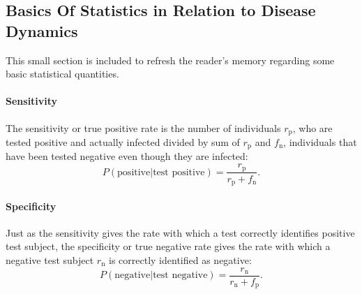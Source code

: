 \subsection{Basics Of Statistics in Relation to Disease Dynamics}
This small section is included to refresh the reader's memory regarding some basic statistical quantities. 
\paragraph{Sensitivity}
The sensitivity or true positive rate is the number of individuals $r_\text{p}$, who are tested positive and actually infected divided by sum of $r_\text{p}$ and $f_\text{n}$, individuals that have been tested negative even though they are infected:
\begin{equation}
P(\text{positive} | \text{test positive}) = \frac{r_\text{p}}{r_\text{p} + f_\text{n}}.
\end{equation}

\paragraph{Specificity}
Just as the sensitivity gives the rate with which a test correctly identifies positive test subject, the specificity or true negative rate gives the rate with which a negative test subject $r_\text{n}$ is correctly identified as negative:
\begin{equation}
P(\text{negative} | \text{test negative}) = \frac{r_\text{n}}{r_\text{n} + f_\text{p}}.
\end{equation}